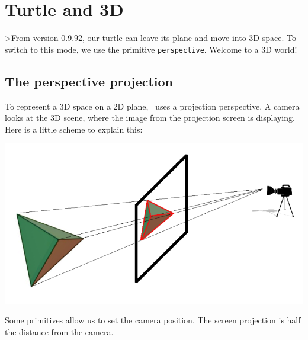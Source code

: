 \section{Turtle and 3D} \label{3D}
>From version 0.9.92, our turtle can leave its plane and move into 3D space. To switch to this mode, we use the primitive \texttt{perspective}. Welcome to a 3D world!
\subsection{The perspective projection}
To represent a 3D space on a 2D plane, \xlogo\ uses a projection perspective. A camera looks at the 3D scene, where the image from the projection screen is displaying. Here is a little scheme to explain this: 
\begin{center}
\includegraphics*[scale=0.6]{pics/perspective.png}
\end{center}
Some primitives allow us to set the camera position. The screen projection is half the distance from the camera.
